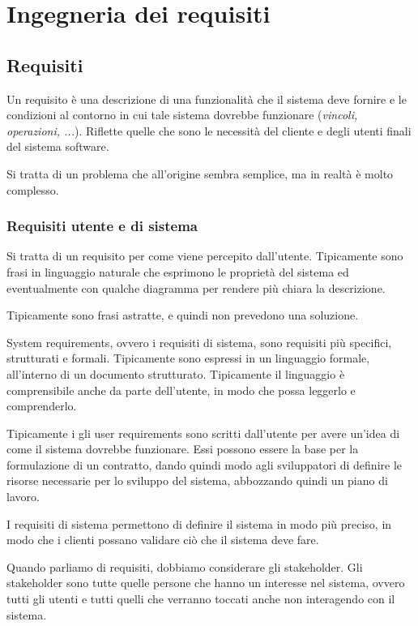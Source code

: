\chapter{Ingegneria dei requisiti}
\section{Requisiti}
Un requisito è una descrizione di una funzionalità che il sistema deve
fornire e le condizioni al contorno in cui tale sistema dovrebbe funzionare
(\textit{vincoli, operazioni, ...}).
Riflette quelle che sono le necessità del cliente e degli utenti finali del sistema 
software.

Si tratta di un problema  che all'origine sembra semplice, ma in realtà è molto
complesso.
\subsection{Requisiti utente e di sistema}

\begin{tcolorbox}[title ={User requirements}]
Si tratta di un requisito per come viene percepito dall'utente. Tipicamente
sono frasi in linguaggio naturale che esprimono le proprietà del sistema ed eventualmente 
con qualche diagramma per rendere più chiara la descrizione.

Tipicamente sono frasi astratte, e quindi non prevedono una soluzione.
\end{tcolorbox}
\begin{tcolorbox}[title ={System requirements}]
System requirements, ovvero i requisiti di sistema, sono requisiti più specifici,
strutturati e formali. Tipicamente sono espressi in un linguaggio formale, all'interno 
di un documento strutturato. Tipicamente il linguaggio è comprensibile anche 
da parte dell'utente, in modo che possa leggerlo e comprenderlo.
\end{tcolorbox}
Tipicamente i gli user requirements sono scritti dall'utente per avere un'idea 
di come il sistema dovrebbe funzionare. Essi possono essere la base per la formulazione di 
un contratto, dando quindi modo agli sviluppatori di definire le risorse necessarie
per lo sviluppo del sistema, abbozzando quindi un piano di lavoro.

I requisiti di sistema permettono di definire il sistema in modo più preciso,
in modo che i clienti possano validare ciò che il sistema deve fare.
\begin{tcolorbox}[title = {Stakeholders}]
Quando parliamo di requisiti, dobbiamo considerare gli stakeholder.
Gli stakeholder sono tutte quelle persone che hanno un interesse nel sistema, 
ovvero tutti gli utenti e tutti quelli che verranno toccati anche non 
interagendo con il sistema.
\end{tcolorbox}

